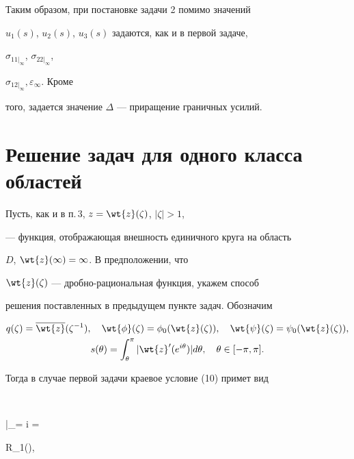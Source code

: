 Таким образом, при постановке задачи 2 помимо значений


$u_1(s)$, $u_2(s)$, $u_3(s)$ задаются, как и в первой задаче,


$\sigma_{11 |_{\infty}}$, $\sigma_{22 |_{\infty}}$,


$\sigma_{12 |_{\infty}}, \varepsilon_{\infty}$. Кроме


того, задается значение $\Delta$ --- приращение граничных усилий.








\section{Решение задач для одного класса областей}





Пусть, как и в п.\,3, $z = \wt{z}(\zeta)$, $|\zeta| > 1$,


--- функция, отображающая внешность единичного круга на область


$D$, $\wt{z}(\infty) = \infty$. В предположении, что


$\wt{z}(\zeta)$ --- дробно-рациональная функция, укажем способ


решения поставленных в предыдущем пункте задач. Обозначим


\begin{gather*}


q(\zeta) = \overline{\wt{z}}(\zeta^{-1}),\quad


\wt{\phi}(\zeta) = \phi_0(\wt{z}(\zeta)),\quad


\wt{\psi}(\zeta) = \psi_0(\wt{z}(\zeta)), \\


s(\theta) = \int_{\theta}^{\pi} |\wt{z}'(e^{i\theta})|


d\theta,\quad \theta \in [-\pi,\pi].


\end{gather*}


Тогда в случае первой задачи краевое условие (10) примет вид


$$


\bigg|_{\zeta = \exp i\theta} =


R_1(\theta),


